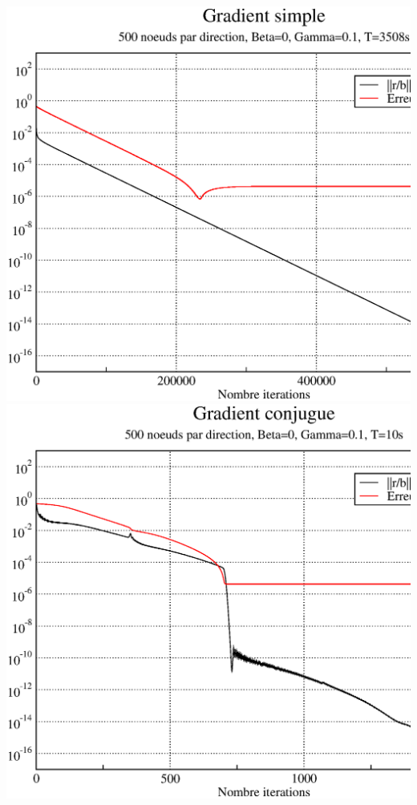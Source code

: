 \documentclass[twoside,12pt]{report}
\theoremstyle{remark}
\begin{document}
\begin{center}
\includegraphics[scale=0.36]{image/gs_500_0_01.eps}
\includegraphics[scale=0.36]{image/gc_500_0_01.eps}
\end{center}
\end{document}
